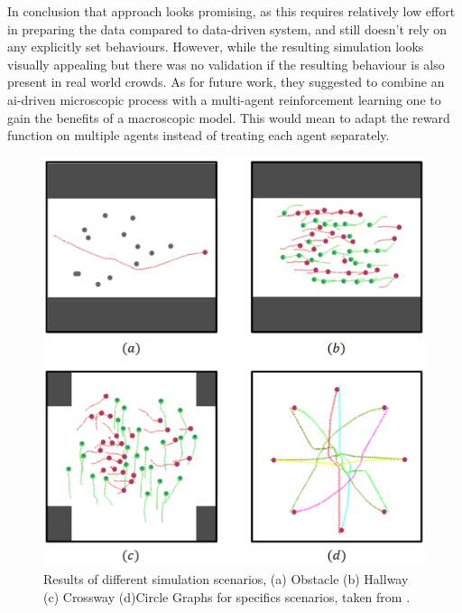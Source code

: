 \documentclass{acmsiggraph}               %
\begin{document}
In conclusion that approach looks promising, as this requires relatively low effort in preparing the data compared to data-driven system, and still doesn't rely on any explicitly set behaviours. However, while the resulting simulation looks visually appealing but there was no validation if the resulting behaviour is also present in real world crowds. As for future work, they suggested to combine an ai-driven microscopic process with a multi-agent reinforcement learning one to gain the benefits of a macroscopic model. This would mean to adapt the reward function on multiple agents instead of treating each agent separately.  

\begin{figure}[h]
  \centering
  \includegraphics[width=1\linewidth]{images/aiSituations.png}
  \caption{Results of different simulation scenarios, (a) Obstacle (b) Hallway (c) Crossway (d)Circle  Graphs for specifics scenarios, taken from \protect\cite{lee_crowd_2018}.}
  \label{fig:aiScenarios}
\end{figure}
\end{document}
